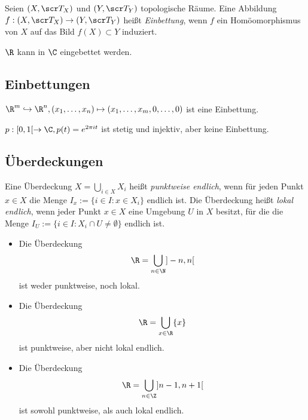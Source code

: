 \begin{df}
	Seien $(X,\scr T_X)$ und $(Y, \scr T_Y)$ topologische Räume.
	Eine Abbildung $f: (X, \scr T_X) \to (Y, \scr T_Y)$ heißt \emph{Einbettung}, wenn $f$ ein Homöomorphismus von $X$ auf das Bild $f(X) \subset Y$ induziert.
\end{df}

\begin{ex}
	$\R$ kann in $\C$ eingebettet werden.
\end{ex}


\subsection{Einbettungen}

\begin{ex}
	$\R^m \injto \R^n, (x_1, \dotsc, x_n) \mapsto (x_1, \dotsc, x_m, 0, \dotsc, 0)$ ist eine Einbettung.

	$p: [0,1[ \to \C, p(t) = e^{2\pi i t}$ ist stetig und injektiv, aber keine Einbettung.
\end{ex}

\subsection{Überdeckungen}

\begin{df}
	Eine Überdeckung $X = \bigcup_{i\in X} X_i$ heißt \emph{punktweise endlich}, wenn für jeden Punkt $x \in X$ die Menge $I_x := \{ i \in I : x \in X_i \}$ endlich ist.
	Die Überdeckung heißt \emph{lokal endlich}, wenn jeder Punkt $x \in X$ eine Umgebung $U$ in $X$ besitzt, für die die Menge $I_U := \{ i \in I : X_i \cap U \neq \emptyset \}$ endlich ist.
\end{df}

\begin{ex}
	\begin{itemize}
		\item
			Die Überdeckung
			\[
				\R = \bigcup_{n \in \N} ]-n, n[
			\]
			ist weder punktweise, noch lokal.
		\item
			Die Überdeckung
			\[
				\R = \bigcup_{x \in \R} \{x\}
			\]
			ist punktweise, aber nicht lokal endlich.
		\item
			Die Überdeckung
			\[
				\R = \bigcup_{n\in \Z} ]n-1, n+ 1[
			\]
			ist sowohl punktweise, als auch lokal endlich.
	\end{itemize}
\end{ex}

